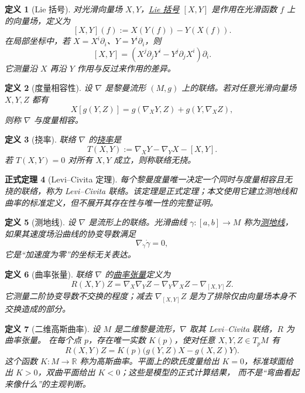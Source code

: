 \documentclass[UTF8,fontset=none,a4paper,11pt]{ctexart}
\theoremstyle{foundation-definition}
\newtheorem{definition}{定义}[section]
\theoremstyle{foundation-theorem}
\newtheorem{theorem}[definition]{正式定理}
\theoremstyle{foundation-proposition}
\theoremstyle{foundation-example}
\theoremstyle{foundation-remark}
\theoremstyle{foundation-theorem}
\newcommand{\term}[2]{\hyperref[#1]{#2}}
\begin{document}
\begin{definition}[Lie 括号]\label{def:lie-bracket}
对光滑向量场 \(X,Y\)，\term{def:lie-bracket}{Lie 括号} \([X,Y]\) 是作用在光滑函数 \(f\) 上的向量场，定义为
\[
[X,Y](f):=X(Y(f))-Y(X(f)).
\]
在局部坐标中，若 \(X=X^i\partial_i\)、\(Y=Y^i\partial_i\)，则
\[
[X,Y]=(X^j\partial_jY^i-Y^j\partial_jX^i)\partial_i.
\]
它测量沿 \(X\) 再沿 \(Y\) 作用与反过来作用的差异。
\end{definition}

\begin{definition}[度量相容性]\label{def:metric-compatibility}
设 \(\nabla\) 是黎曼流形 \((M,g)\) 上的联络。若对任意光滑向量场 \(X,Y,Z\) 都有
\[
X[g(Y,Z)]=g(\nabla_XY,Z)+g(Y,\nabla_XZ),
\]
则称 \(\nabla\) 与度量相容。
\end{definition}

\begin{definition}[挠率]\label{def:torsion}
联络 \(\nabla\) 的\term{def:torsion}{挠率}是
\[
T(X,Y):=\nabla_XY-\nabla_YX-[X,Y].
\]
若 \(T(X,Y)=0\) 对所有 \(X,Y\) 成立，则称联络无挠。
\end{definition}

\begin{theorem}[Levi--Civita 定理]
每个黎曼度量唯一决定一个同时与度量相容且无挠的联络，称为 Levi--Civita 联络。该定理是正式定理；本文使用它建立测地线和曲率的标准定义，但不展开其存在性与唯一性的完整证明。
\end{theorem}

\begin{definition}[测地线]\label{def:geodesic}
设 \(\nabla\) 是流形上的联络。光滑曲线 \(\gamma:[a,b]\to M\) 称为\term{def:geodesic}{测地线}，如果其速度场沿曲线的协变导数满足
\[
\nabla_{\dot\gamma}\dot\gamma=0,
\]
它是“加速度为零”的坐标无关表达。
\end{definition}

\begin{definition}[曲率张量]\label{def:curvature-tensor}
联络 \(\nabla\) 的\term{def:curvature-tensor}{曲率张量}定义为
\[
R(X,Y)Z=\nabla_X\nabla_YZ-\nabla_Y\nabla_XZ-\nabla_{[X,Y]}Z.
\]
它测量二阶协变导数不交换的程度；减去 \(\nabla_{[X,Y]}Z\) 是为了排除仅由向量场本身不交换造成的部分。
\end{definition}

\begin{definition}[二维高斯曲率]\label{def:gaussian-curvature}
设 \(M\) 是二维黎曼流形，\(\nabla\) 取其 Levi--Civita 联络，\(R\) 为曲率张量。
在每个点 \(p\)，存在唯一实数 \(K(p)\)，使对任意
\(X,Y,Z\in T_pM\) 有
\[
R(X,Y)Z
=K(p)\bigl(g(Y,Z)X-g(X,Z)Y\bigr).
\]
这个函数 \(K:M\to\mathbb R\) 称为高斯曲率。平面上的欧氏度量给出
\(K=0\)，标准球面给出 \(K>0\)，双曲平面给出 \(K<0\)；这些是模型的正式计算结果，
而不是“弯曲看起来像什么”的主观判断。
\end{definition}
\end{document}
